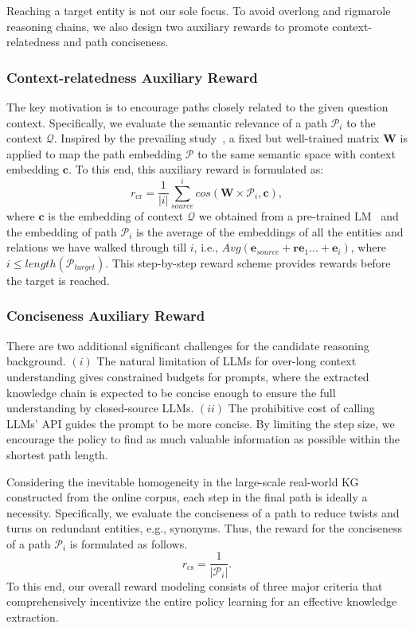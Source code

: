 \documentclass{article}
\theoremstyle{boldremark}
\begin{document}
Reaching a target entity is not our sole focus.  To avoid overlong and rigmarole reasoning chains, we also design two auxiliary rewards to promote context-relatedness and path conciseness. 




\subsubsection{Context-relatedness Auxiliary Reward} 
The key motivation is to encourage paths closely related to the given question context. Specifically, we evaluate the semantic relevance of a path $\mathcal{P}_i$ to the context $\mathcal{Q}$. Inspired by the prevailing study~\cite{QA-GNN}, a fixed but well-trained matrix $\boldsymbol{W}$ is applied to map the path embedding $\boldsymbol{\mathcal{P}}$ to the same semantic space with context embedding $\boldsymbol{c}$. To this end, this auxiliary reward is formulated as:
\vspace{-2mm}
\begin{equation}
    r_{\text{cr}} = \frac{1}{|i|} \sum_{source}^{i}cos(\boldsymbol{W\times\mathcal{P}}_{i}, \boldsymbol{c}),
\end{equation}
where $\boldsymbol{c}$ is the embedding of context $\mathcal{Q}$ we obtained from a pre-trained LM~\cite{devlin2018bert} and the embedding of path $\mathcal{P}_{i}$ is the average of the embeddings of all the entities and relations we have walked through till $i$, i.e., $Avg(\boldsymbol{e}_{source}+\boldsymbol{re}_{1}...+\boldsymbol{e}_{i})$, where $i\leq length(\mathcal{P}_{target})$. This step-by-step reward scheme provides rewards before the target is reached.


\subsubsection{Conciseness Auxiliary Reward} There are two additional significant challenges for the candidate reasoning background.  \((i)\) The natural limitation of LLMs for over-long context understanding gives constrained budgets for prompts, where the extracted knowledge chain is expected to be concise enough to ensure the full understanding by closed-source LLMs. \((ii)\) The prohibitive cost of calling  LLMs' API guides the prompt to be more concise. By limiting the step size, we encourage the policy to find as much valuable information as possible within the shortest path length.

Considering the inevitable homogeneity in the large-scale real-world KG constructed from the online corpus, each step in the final path is ideally a necessity. Specifically, we evaluate the conciseness of a path to reduce twists and turns on redundant entities, e.g., synonyms. Thus, the reward for the conciseness of a path $\mathcal{P}_{i}$ is formulated as follows.
\begin{equation}
    r_{\text{cs}} = \frac{1}{|\mathcal{P}_{i}|}.
\end{equation}
To this end, our overall reward modeling consists of three major criteria that comprehensively incentivize the entire policy learning for an effective knowledge extraction. 
\end{document}
